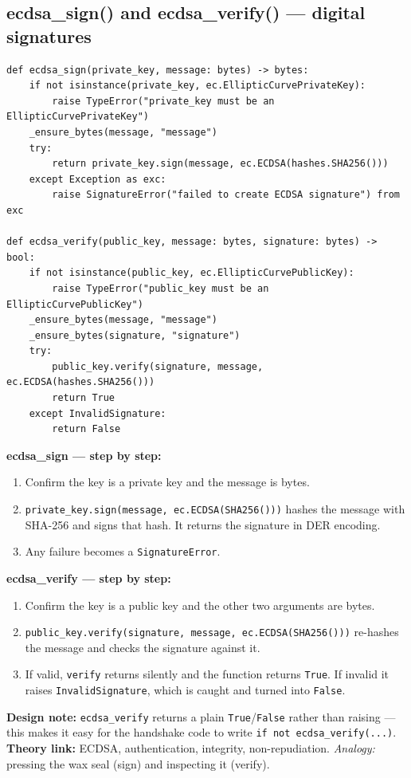 \documentclass[11pt,a4paper]{article}
\begin{document}
\subsection{ecdsa\_sign() and ecdsa\_verify() --- digital signatures}
\begin{lstlisting}[style=py,caption={crypto.py --- ECDSA signing and verification.}]
def ecdsa_sign(private_key, message: bytes) -> bytes:
    if not isinstance(private_key, ec.EllipticCurvePrivateKey):
        raise TypeError("private_key must be an EllipticCurvePrivateKey")
    _ensure_bytes(message, "message")
    try:
        return private_key.sign(message, ec.ECDSA(hashes.SHA256()))
    except Exception as exc:
        raise SignatureError("failed to create ECDSA signature") from exc

def ecdsa_verify(public_key, message: bytes, signature: bytes) -> bool:
    if not isinstance(public_key, ec.EllipticCurvePublicKey):
        raise TypeError("public_key must be an EllipticCurvePublicKey")
    _ensure_bytes(message, "message")
    _ensure_bytes(signature, "signature")
    try:
        public_key.verify(signature, message, ec.ECDSA(hashes.SHA256()))
        return True
    except InvalidSignature:
        return False
\end{lstlisting}
\textbf{ecdsa\_sign --- step by step:}
\begin{enumerate}
  \item Confirm the key is a private key and the message is bytes.
  \item \texttt{private\_key.sign(message, ec.ECDSA(SHA256()))} hashes the
        message with SHA-256 and signs that hash. It returns the signature in
        DER encoding.
  \item Any failure becomes a \texttt{SignatureError}.
\end{enumerate}
\textbf{ecdsa\_verify --- step by step:}
\begin{enumerate}
  \item Confirm the key is a public key and the other two arguments are bytes.
  \item \texttt{public\_key.verify(signature, message, ec.ECDSA(SHA256()))}
        re-hashes the message and checks the signature against it.
  \item If valid, \texttt{verify} returns silently and the function returns
        \texttt{True}. If invalid it raises \texttt{InvalidSignature}, which is
        caught and turned into \texttt{False}.
\end{enumerate}
\textbf{Design note:} \texttt{ecdsa\_verify} returns a plain
\texttt{True}/\texttt{False} rather than raising --- this makes it easy for the
handshake code to write \texttt{if not ecdsa\_verify(...)}. \textbf{Theory link:}
ECDSA, authentication, integrity, non-repudiation. \emph{Analogy:} pressing the
wax seal (sign) and inspecting it (verify).
\end{document}
